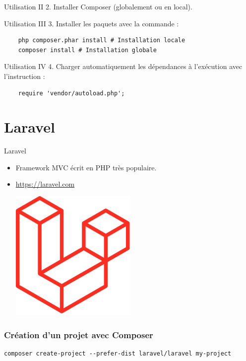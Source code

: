 \documentclass{beamer}
\begin{document}
\begin{frame}{Utilisation II}
  2. Installer Composer (globalement ou en local).
\end{frame}

\begin{frame}[fragile]{Utilisation III}
  3. Installer les paquets avec la commande :
  \begin{Verbatim}
    php composer.phar install # Installation locale
    composer install # Installation globale
  \end{Verbatim}
\end{frame}

\begin{frame}[fragile]{Utilisation IV}
  4. Charger automatiquement les dépendances à l'exécution avec l'instruction :
  \begin{verbatim}
    require 'vendor/autoload.php';
  \end{verbatim}
\end{frame}

\section{Laravel}
\begin{frame}{Laravel}
\begin{itemize}
  \item Framework MVC écrit en PHP très populaire.
  \item \url{https://laravel.com}
    \vspace{10pt}
    \begin{center}
      \includegraphics[scale=0.3]{images/laravel.png}
    \end{center}
\end{itemize}
\end{frame}

\begin{frame}[fragile]
\frametitle{Création d'un projet avec Composer}
\begin{Verbatim}[fontsize=\scriptsize]
  composer create-project --prefer-dist laravel/laravel my-project
\end{Verbatim}
\end{frame}
\end{document}
